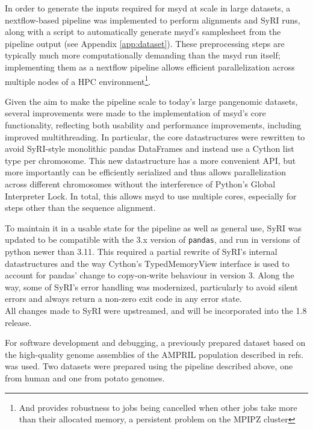 In order to generate the inputs required for msyd at scale in large datasets, a nextflow-based pipeline was implemented to perform alignments and SyRI runs, along with a script to automatically generate msyd's samplesheet from the pipeline output (see Appendix \ref{app:dataset}).
These preprocessing steps are typically much more computationally demanding than the msyd run itself; implementing them as a nextflow pipeline allows efficient parallelization across multiple nodes of a HPC environment\footnote{And provides robustness to jobs being cancelled when other jobs take more than their allocated memory, a persistent problem on the MPIPZ cluster}.


Given the aim to make the pipeline scale to today's large pangenomic datasets, several improvements were made to the implementation of msyd's core functionality, reflecting both usability and performance improvements, including improved multithreading.
In particular, the core datastructures were rewritten to avoid SyRI-style monolithic pandas DataFrames and instead use a Cython list type per chromosome.
This new datastructure has a more convenient API, but more importantly can be efficiently serialized and thus allows parallelization across different chromosomes without the interference of Python's Global Interpreter Lock. %
In total, this allows msyd to use multiple cores, especially for steps other than the sequence alignment.

To maintain it in a usable state for the pipeline as well as general use, SyRI was updated to be compatible with the 3.x version of \texttt{pandas}, and run in versions of python newer than 3.11.
This required a partial rewrite of SyRI's internal datastructures and the way Cython's TypedMemoryView interface is used to account for pandas' change to copy-on-write behaviour in version 3.
Along the way, some of SyRI's error handling was modernized, particularly to avoid silent errors and always return a non-zero exit code in any error state.\\
All changes made to SyRI were upstreamed, and will be incorporated into the 1.8 release.

For software development and debugging, a previously prepared dataset based on the high-quality genome assemblies of the AMPRIL population described in refs. \cite{jiao20, ampril} was used.
Two datasets were prepared using the pipeline described above, one from human and one from potato genomes.

